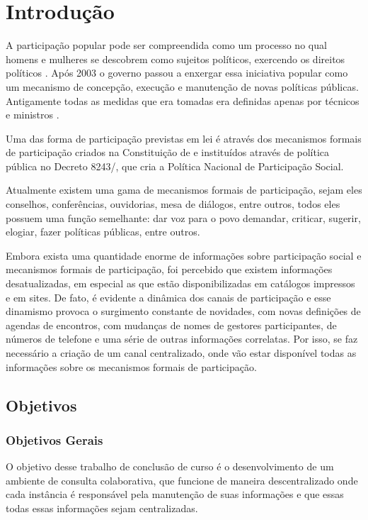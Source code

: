 \chapter{Introdução}

A participação popular pode ser compreendida como um processo no qual homens e mulheres se descobrem como sujeitos políticos, exercendo os direitos políticos \cite{almeida2011participacao}. Após 2003 o governo passou a enxergar essa iniciativa popular como um mecanismo de concepção, execução e manutenção de novas políticas públicas. Antigamente todas as medidas que era tomadas era definidas apenas por técnicos e ministros \cite{sgpr2010conselhos}.

Uma das forma de participação previstas em lei é através dos mecanismos formais de participação criados na Constituição de \citeyear{cf} e instituídos através de política pública no Decreto 8243/\citeyear{decreto8243}, que cria a Política Nacional de Participação Social.

Atualmente existem uma gama de mecanismos formais de participação, sejam eles conselhos, conferências, ouvidorias, mesa de diálogos, entre outros, todos eles possuem uma função semelhante: dar voz para o povo demandar, criticar, sugerir, elogiar, fazer políticas públicas, entre outros. 

Embora exista uma quantidade enorme de informações sobre participação social e mecanismos formais de participação, foi percebido que existem informações desatualizadas, em especial as que estão disponibilizadas em catálogos impressos e em sites. De fato, é evidente a dinâmica dos canais de participação e esse dinamismo provoca o surgimento constante de novidades, com novas definições de agendas de encontros, com mudanças de nomes de gestores participantes, de números de telefone e uma série de outras informações correlatas. Por isso, se faz necessário a criação de um canal centralizado, onde vão estar disponível todas as informações sobre os mecanismos formais de participação.

\section{Objetivos}

\subsection{Objetivos Gerais}

O objetivo desse trabalho de conclusão de curso é o desenvolvimento de um ambiente de consulta colaborativa, que funcione de maneira descentralizado onde cada instância é responsável pela manutenção de suas informações e que essas todas essas informações sejam centralizadas. 

